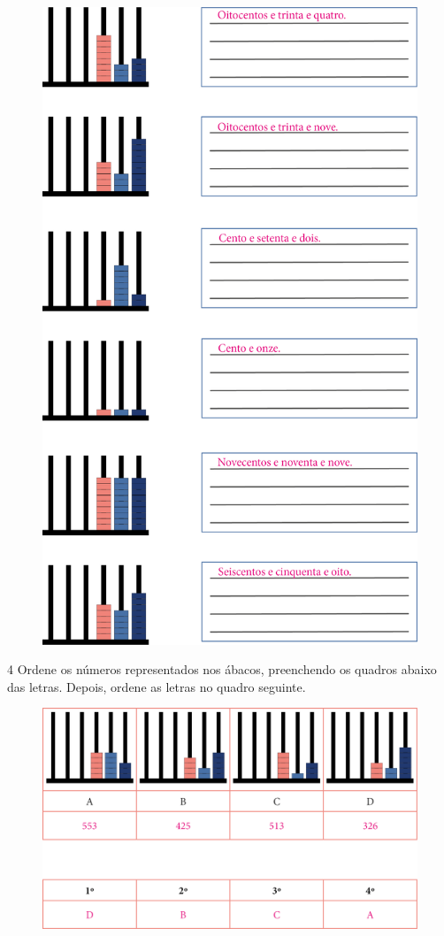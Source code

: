 \begin{figure}[htpb!]
\includegraphics[width=.7\textwidth]{./media/image5.png}
\end{figure}

\pagebreak

\num{4} Ordene os números representados nos ábacos, preenchendo os
quadros abaixo das letras. Depois, ordene as letras no quadro seguinte.

\begin{figure}[htpb!]
\includegraphics[width=\textwidth]{./media/image6.png}
\end{figure}

